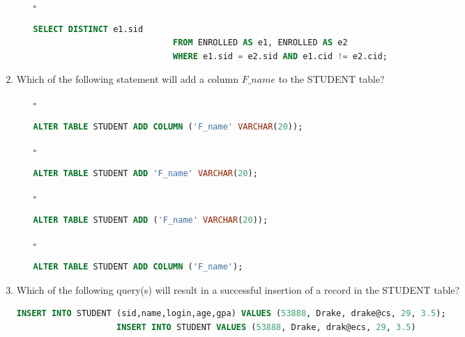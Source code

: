 \documentclass[10pt]{article}
\begin{document}
\begin{enumerate}
\begin{enumerate}
					\item[$\square$] 
						\begin{lstlisting}[language=SQL,firstline=1, lastline=3, numbers = right] 
							SELECT DISTINCT e1.sid 
							FROM ENROLLED AS e1, ENROLLED AS e2 
							WHERE e1.sid = e2.sid AND e1.cid != e2.cid;
						\end{lstlisting}
				\end{enumerate}	

			\item Which of the following statement will add a column $F \_ name$ to the STUDENT table?
				\begin{enumerate}
					\item[$\square$] 
						\begin{lstlisting}[language=SQL,firstline=1, lastline=1, numbers = right] 
							ALTER TABLE STUDENT ADD COLUMN ('F_name' VARCHAR(20));
						\end{lstlisting} 
					
					\item[$\square$] 
						\begin{lstlisting}[language=SQL,firstline=1, lastline=1, numbers = right] 
							ALTER TABLE STUDENT ADD 'F_name' VARCHAR(20);
						\end{lstlisting} 
					
					\item[$\square$] 
						\begin{lstlisting}[language=SQL,firstline=1, lastline=1, numbers = right] 
							ALTER TABLE STUDENT ADD ('F_name' VARCHAR(20));
						\end{lstlisting} 
					
					\item[$\square$] 
						\begin{lstlisting}[language=SQL,firstline=1, lastline=1, numbers = right] 
							ALTER TABLE STUDENT ADD COLUMN ('F_name');
						\end{lstlisting}
				\end{enumerate}

			\newpage

			\item Which of the following query(s) will result in a successful insertion of a record in the STUDENT table?
				\begin{lstlisting}[language=SQL,firstline=1, lastline=2] 
					INSERT INTO STUDENT (sid,name,login,age,gpa) VALUES (53888, Drake, drake@cs, 29, 3.5);
					INSERT INTO STUDENT VALUES (53888, Drake, drak@ecs, 29, 3.5)
				\end{lstlisting} 


\end{enumerate}
\end{document}
